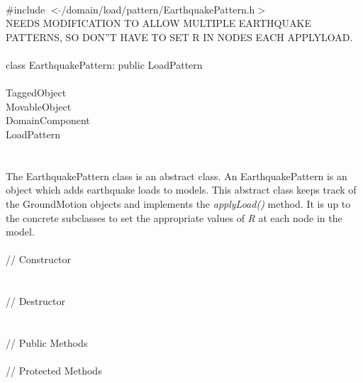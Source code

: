 
   \\
\indent \#include $<\tilde{ }$/domain/load/pattern/EarthquakePattern.h$>$  \\

NEEDS MODIFICATION TO ALLOW MULTIPLE EARTHQUAKE PATTERNS, SO DON''T
HAVE TO SET R IN NODES EACH APPLYLOAD.\\

  \\
\indent class EarthquakePattern: public LoadPattern  \\

 \\
\indent TaggedObject \\
\indent MovableObject \\
\indent\indent DomainComponent \\
\indent\indent\indent LoadPattern \\
\indent\indent\indent{} \\

 \\ 
\indent The EarthquakePattern class is an abstract class. An
EarthquakePattern is an object which adds earthquake loads to
models. This abstract class keeps track of the GroundMotion objects
and implements the {\em applyLoad()} method. It is up to the concrete
subclasses to set the appropriate values of {\em R} at each node in
the model.\\

 \\
\indent // Constructor \\ 
\\ \\
\indent // Destructor \\ 
\\  \\
\indent // Public Methods \\ 
 \\ 
\indent // Protected Methods \\ \\
 \\

